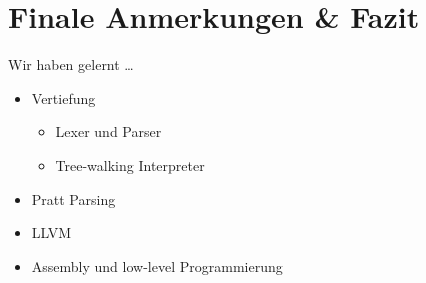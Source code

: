 \section{Finale Anmerkungen \& Fazit}
\begin{frame}{Wir haben gelernt \dots}
    \begin{itemize}
        \item<1-> Vertiefung
            \begin{itemize}
                \item <2-> Lexer und Parser
                \item <3-> Tree-walking Interpreter
            \end{itemize}
        \item<4-> Pratt Parsing
        \item<5-> LLVM
        \item<6-> Assembly und low-level Programmierung
    \end{itemize}
\end{frame}
